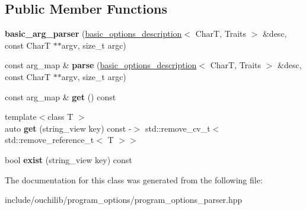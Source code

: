 \subsection*{Public Member Functions}
\begin{DoxyCompactItemize}
\item 
\mbox{\label{classouchi_1_1program__options_1_1basic__arg__parser_aa7e38c56b3c9674eb603b6ef7fc74eee}} 
{\bfseries basic\+\_\+arg\+\_\+parser} (\mbox{\hyperlink{classouchi_1_1program__options_1_1basic__options__description}{basic\+\_\+options\+\_\+description}}$<$ CharT, Traits $>$ \&desc, const CharT $\ast$$\ast$argv, size\+\_\+t argc)
\item 
\mbox{\label{classouchi_1_1program__options_1_1basic__arg__parser_a57900bbd85e8e594192583b4a598680f}} 
const arg\+\_\+map \& {\bfseries parse} (\mbox{\hyperlink{classouchi_1_1program__options_1_1basic__options__description}{basic\+\_\+options\+\_\+description}}$<$ CharT, Traits $>$ \&desc, const CharT $\ast$$\ast$argv, size\+\_\+t argc)
\item 
\mbox{\label{classouchi_1_1program__options_1_1basic__arg__parser_ac1cf166db6818047273331180f81b89e}} 
const arg\+\_\+map \& {\bfseries get} () const
\item 
\mbox{\label{classouchi_1_1program__options_1_1basic__arg__parser_aa0114175f642520cc08c2f9b184e0b02}} 
{\footnotesize template$<$class T $>$ }\\auto {\bfseries get} (string\+\_\+view key) const -\/$>$ std\+::remove\+\_\+cv\+\_\+t$<$ std\+::remove\+\_\+reference\+\_\+t$<$ T $>$$>$
\item 
\mbox{\label{classouchi_1_1program__options_1_1basic__arg__parser_a4d17dc70948b00e7230dd7ec28f94b5a}} 
bool {\bfseries exist} (string\+\_\+view key) const
\end{DoxyCompactItemize}


The documentation for this class was generated from the following file\+:\begin{DoxyCompactItemize}
\item 
include/ouchilib/program\+\_\+options/program\+\_\+options\+\_\+parser.\+hpp\end{DoxyCompactItemize}
